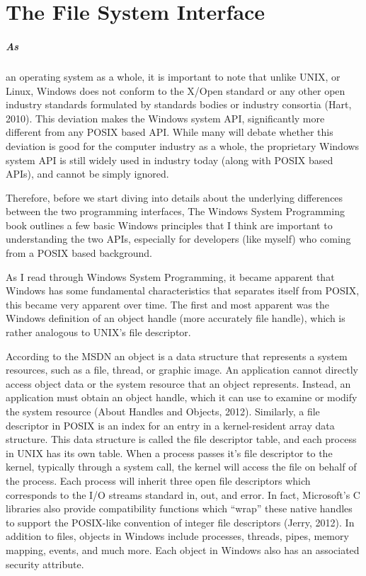 \documentclass[11pt]{report}
\begin{document}
\chapter{The File System Interface}

\paragraph{As} an operating system as a whole, it is important to note that unlike UNIX, or Linux, Windows does not conform to the X/Open standard or any other open industry standards formulated by standards bodies or industry consortia (Hart, 2010). This deviation makes the Windows system API, significantly more different from any POSIX based API.  While many will debate whether this deviation is good for the computer industry as a whole, the proprietary Windows system API is still widely used in industry today (along with POSIX based APIs), and cannot be simply ignored. 
 
Therefore, before we start diving into details about the underlying differences between the two programming interfaces, The Windows System Programming book outlines a few basic Windows principles that I think are important to understanding the two APIs, especially for developers (like myself) who coming from a POSIX based background.
 
As I read through Windows System Programming, it became apparent that Windows has some fundamental characteristics that separates itself from POSIX, this became very apparent over time. The first and most apparent was the Windows definition of an object handle (more accurately file handle), which is rather analogous to UNIX's file descriptor.
 
According to the MSDN an object is a data structure that represents a system resources, such as a file, thread, or graphic image. An application cannot directly access object data or the system resource that an object represents. Instead, an application must obtain an object handle, which it can use to examine or modify the system resource (About Handles and Objects, 2012). Similarly, a file descriptor in POSIX is an index for an entry in a kernel-resident array data structure. This data structure is called the file descriptor table, and each process in UNIX has its own table. When a process passes it’s file descriptor to the kernel, typically through a system call, the kernel will access the file on behalf of the process. Each process will inherit three open file descriptors which corresponds to the I/O streams standard in, out, and error.  In fact, Microsoft’s C libraries also provide compatibility functions which “wrap” these native handles to support the POSIX-like convention of integer file descriptors (Jerry, 2012). In addition to files, objects in Windows include processes, threads, pipes, memory mapping, events, and much more. Each object in Windows also has an associated security attribute.
\end{document}
